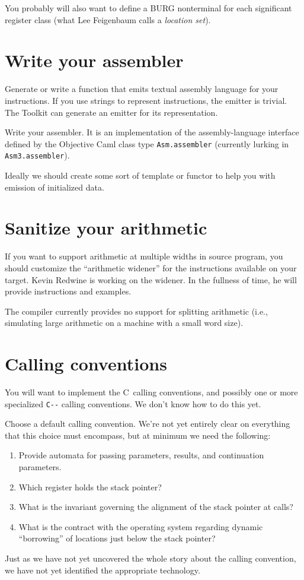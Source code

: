\documentclass[12pt]{article}
\newcommand\PAL{\texttt{C-{}-}}
\begin{document}
You probably will also want to define a BURG nonterminal for each
significant register class (what Lee Feigenbaum calls a \emph{location
set}). 

\section{Write your assembler}

Generate or write a function that emits textual assembly language for
your instructions.
If you use strings to represent instructions, the emitter is trivial.
The Toolkit can generate an emitter for its representation.

Write your assembler.
It is an implementation of the assembly-language interface defined by
the Objective Caml class type 
\texttt{Asm.assembler} (currently lurking in \texttt{Asm3.assembler}).

Ideally we should create some sort of template or functor to help you
with emission of initialized data.


\section{Sanitize your arithmetic}

If you want to support arithmetic at multiple widths in source
program, you should customize the ``arithmetic widener'' for the
instructions available on 
your target.
Kevin Redwine is working on the widener.
In the fullness of time, he will provide instructions and
examples.

The compiler currently provides no support for splitting arithmetic
(i.e., simulating large arithmetic on a machine with a small word size).

\section{Calling conventions}

You will want to implement the C~calling conventions, and possibly one
or more specialized {\PAL} calling conventions.
We don't know how to do this yet.

Choose a default calling convention.
We're not yet entirely clear on everything that this choice must
encompass, but at minimum we need the following:
\begin{enumerate}
\item
Provide automata for passing parameters, results, and continuation parameters.
\item
Which register holds the stack pointer?
\item
What is the invariant governing the alignment of the stack pointer at
calls?
\item
What is the contract with the operating system regarding dynamic
``borrowing'' of locations just below the stack pointer?
\end{enumerate}
Just as we have not yet uncovered the whole story about the calling
convention, we have not yet identified the appropriate technology.
\end{document}

